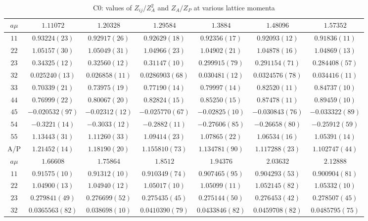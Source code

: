 \begin{table}
\begin{center}
\caption{C0: values of $Z_{ij}/Z_A^2$ and $Z_A/Z_P$ at various lattice momenta}
\begin{tabular}{c|c c c c c c}
\hline
\hline
$a\mu$ & $1.11072$ & $1.20328$ & $1.29584$ & $1.3884$ & $1.48096$ & $1.57352$ \\
\hline
$11$ & $0.93224(23)$ & $0.92917(26)$ & $0.92629(18)$ & $0.92356(17)$ & $0.92093(12)$ & $0.91836(11)$ \\
$22$ & $1.05157(30)$ & $1.05049(31)$ & $1.04966(23)$ & $1.04902(21)$ & $1.04878(16)$ & $1.04869(13)$ \\
$23$ & $0.34325(12)$ & $0.32560(12)$ & $0.31147(10)$ & $0.299915(79)$ & $0.291154(71)$ & $0.284408(57)$ \\
$32$ & $0.025240(13)$ & $0.026858(11)$ & $0.0286903(68)$ & $0.030481(12)$ & $0.0324576(78)$ & $0.034416(11)$ \\
$33$ & $0.70339(21)$ & $0.73975(19)$ & $0.77190(14)$ & $0.79997(14)$ & $0.82520(11)$ & $0.84737(10)$ \\
$44$ & $0.76999(22)$ & $0.80067(20)$ & $0.82824(15)$ & $0.85250(15)$ & $0.87478(11)$ & $0.89459(10)$ \\
$45$ & $-0.020532(97)$ & $-0.02312(12)$ & $-0.025770(67)$ & $-0.02825(10)$ & $-0.030843(76)$ & $-0.033322(89)$ \\
$54$ & $-0.3221(14)$ & $-0.3033(12)$ & $-0.2882(11)$ & $-0.27606(85)$ & $-0.26658(80)$ & $-0.25912(59)$ \\
$55$ & $1.13443(31)$ & $1.11260(33)$ & $1.09414(23)$ & $1.07865(22)$ & $1.06534(16)$ & $1.05391(14)$ \\
\hline
A/P & $1.21452(14)$ & $1.18190(20)$ & $1.155810(73)$ & $1.134781(90)$ & $1.117288(23)$ & $1.102747(44)$ \\
\hline
$a\mu$ & $1.66608$ & $1.75864$ & $1.8512$ & $1.94376$ & $2.03632$ & $2.12888$ \\
\hline
$11$ & $0.91575(10)$ & $0.91312(10)$ & $0.910349(74)$ & $0.907465(95)$ & $0.904293(53)$ & $0.900904(81)$ \\
$22$ & $1.04900(13)$ & $1.04940(12)$ & $1.05017(10)$ & $1.05099(11)$ & $1.052145(82)$ & $1.05332(10)$ \\
$23$ & $0.279841(49)$ & $0.276699(52)$ & $0.275435(45)$ & $0.275144(50)$ & $0.276453(42)$ & $0.278507(45)$ \\
$32$ & $0.0365563(82)$ & $0.038698(10)$ & $0.0410390(79)$ & $0.0433846(82)$ & $0.0459708(82)$ & $0.0485795(75)$ \\

\end{tabular}
\end{center}
\end{table}
